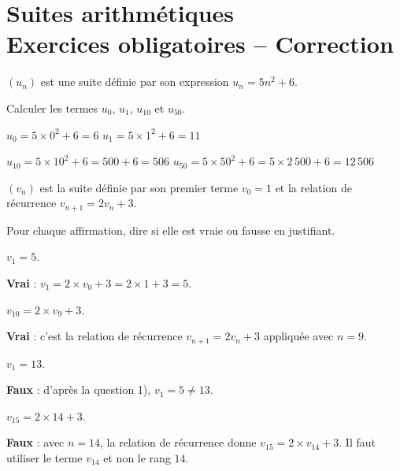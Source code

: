 \documentclass[12pt,a4paper]{book}
\begin{document}
\graphicspath{{images/}}
\chapter[Suites - Exercices (correction)]{Suites arithmétiques \\ Exercices obligatoires -- Correction}
\thispagestyle{fancy}


\exerciceDS{}

$(u_n)$ est une suite définie par son expression $u_n=5n^2+6$.

\begin{itemMet}
	\item Calculer les termes $u_0$, $u_1$, $u_{10}$ et $u_{50}$.

	\begin{corrBox}
		$u_0=5\times 0^2+6=6$ \qquad $u_1=5\times 1^2+6=11$

		$u_{10}=5\times 10^2+6=500+6=506$ \qquad $u_{50}=5\times 50^2+6=5\times 2\,500+6=12\,506$
	\end{corrBox}
\end{itemMet}

\exerciceDS{}

$(v_n)$ est la suite définie par son premier terme $v_0=1$ et la relation de récurrence $v_{n+1}=2v_n+3$.

Pour chaque affirmation, dire si elle est vraie ou fausse en justifiant.
\begin{enumMet}
	\item $v_1=5$.

	\begin{corrBox}
		\textbf{Vrai} : $v_1=2\times v_0+3=2\times 1+3=5$.
	\end{corrBox}
	\item $v_{10}=2\times v_9+3$.

	\begin{corrBox}
		\textbf{Vrai} : c'est la relation de récurrence $v_{n+1}=2v_n+3$ appliquée avec $n=9$.
	\end{corrBox}
	\item $v_1=13$.

	\begin{corrBox}
		\textbf{Faux} : d'après la question 1), $v_1=5\neq 13$.
	\end{corrBox}
	\item $v_{15}=2\times 14+3$.

	\begin{corrBox}
		\textbf{Faux} : avec $n=14$, la relation de récurrence donne $v_{15}=2\times v_{14}+3$. Il faut utiliser le terme $v_{14}$ et non le rang $14$.
	\end{corrBox}
\end{enumMet}
\end{document}
